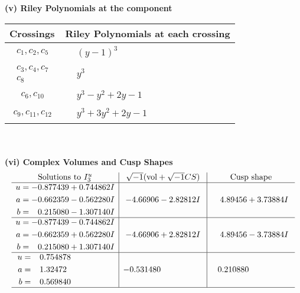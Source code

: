 \documentclass[1p]{elsarticle_modified}
\theoremstyle{definition}
\newcommand{\I}{\sqrt{-1}}
\begin{document}
\newpage\renewcommand{\arraystretch}{1}
\flushleft \textbf{(v) Riley Polynomials at the component}\newline \\
\begin{tabular}{m{50pt}|m{274pt}}
Crossings & \hspace{64pt}Riley Polynomials at each crossing \\
\hline $$\begin{aligned}c_{1},c_{2},c_{5}\end{aligned}$$&$\begin{aligned}
&(y-1)^3
\end{aligned}$\\
\hline $$\begin{aligned}c_{3},c_{4},c_{7}\\c_{8}\end{aligned}$$&$\begin{aligned}
&y^3
\end{aligned}$\\
\hline $$\begin{aligned}c_{6},c_{10}\end{aligned}$$&$\begin{aligned}
&y^3- y^2+2 y-1
\end{aligned}$\\
\hline $$\begin{aligned}c_{9},c_{11},c_{12}\end{aligned}$$&$\begin{aligned}
&y^3+3 y^2+2 y-1
\end{aligned}$\\
\hline
\end{tabular}\\~\\
\newpage\flushleft \textbf{(vi) Complex Volumes and Cusp Shapes}
$$\begin{array}{c|c|c}  
\text{Solutions to }I^u_{3}& \I (\text{vol} + \sqrt{-1}CS) & \text{Cusp shape}\\
 \hline 
\begin{aligned}
u &= -0.877439 + 0.744862 I \\
a &= -0.662359 - 0.562280 I \\
b &= \phantom{-}0.215080 - 1.307140 I\end{aligned}
 & -4.66906 - 2.82812 I & \phantom{-}4.89456 + 3.73884 I \\ \hline\begin{aligned}
u &= -0.877439 - 0.744862 I \\
a &= -0.662359 + 0.562280 I \\
b &= \phantom{-}0.215080 + 1.307140 I\end{aligned}
 & -4.66906 + 2.82812 I & \phantom{-}4.89456 - 3.73884 I \\ \hline\begin{aligned}
u &= \phantom{-}0.754878\phantom{ +0.000000I} \\
a &= \phantom{-}1.32472\phantom{ +0.000000I} \\
b &= \phantom{-}0.569840\phantom{ +0.000000I}\end{aligned}
 & -0.531480\phantom{ +0.000000I} & \phantom{-}0.210880\phantom{ +0.000000I}\\
 \hline 
 \end{array}$$\newpage
\end{document}
